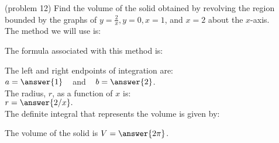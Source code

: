 \documentclass{ximera}
\begin{document}
\begin{problem}(problem 12)
Find the volume of the solid obtained by revolving the region bounded by the graphs of $y = \frac{2}{x}, y = 0, x = 1$, and $x = 2$ about the $x$-axis.\\
The method we will use is:
\begin{multipleChoice}
\end{multipleChoice}

The formula associated with this method is:
\begin{multipleChoice}
\end{multipleChoice}

The left and right endpoints of integration are:\\
$a = \answer{1}\;\;\;$ and $\;\;\; b = \answer{2}$.\\
The radius, $r$, as a function of $x$ is:\\
$r = \answer{2/x}.$\\

The definite integral that represents the volume is given by:\\
\begin{multipleChoice}
\end{multipleChoice}

The volume of the solid is $V = \answer{2\pi}$.

\end{problem}
\end{document}
